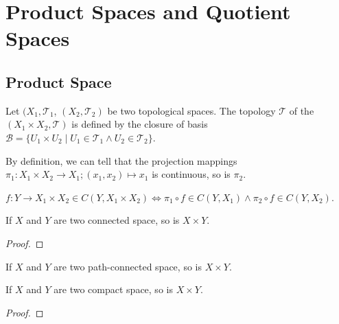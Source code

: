 \documentclass[openany]{book}
\begin{document}
\chapter{Product Spaces and Quotient Spaces}

\section{Product Space}

\begin{definition}%
	\label{def: product space}
	Let $(X_1, \mathscr T_1$, $(X_2, \mathscr T_2)$ be two topological spaces. The topology $\mathscr T$ of the  $(X_1 \times X_2, \mathscr T)$ is defined by the closure of basis $\mathscr B = \{U_1 \times U_2 \mid U_1 \in \mathscr T_1 \wedge U_2 \in \mathscr T_2\}$.
\end{definition}

By definition, we can tell that the projection mappings $\pi_1 \colon X_1 \times X_2 \to X_1 ; (x_1, x_2) \mapsto x_1$ is continuous, so is $\pi_2$.

\begin{theorem}%
	\label{theorem: continuity of component mappings to product space}
	$f \colon Y \to X_1 \times X_2 \in C(Y, X_1 \times X_2) \iff \pi_1 \circ f \in C(Y, X_1) \wedge \pi_2 \circ f \in C(Y, X_2)$.
\end{theorem}

\begin{theorem}%
	\label{theorem: Connectedness is productible}
	If $X$ and $Y$ are two connected space, so is $X \times Y$.
\end{theorem}
\begin{proof}
\end{proof}

\begin{theorem}%
	\label{theorem: Path-connectedness is productible}
	If $X$ and $Y$ are two path-connected space, so is $X \times Y$.
\end{theorem}

\begin{theorem}%
	\label{theorem: Compactness is productible}
	If $X$ and $Y$ are two compact space, so is $X \times Y$.
\end{theorem}
\begin{proof}
\end{proof}
\end{document}
